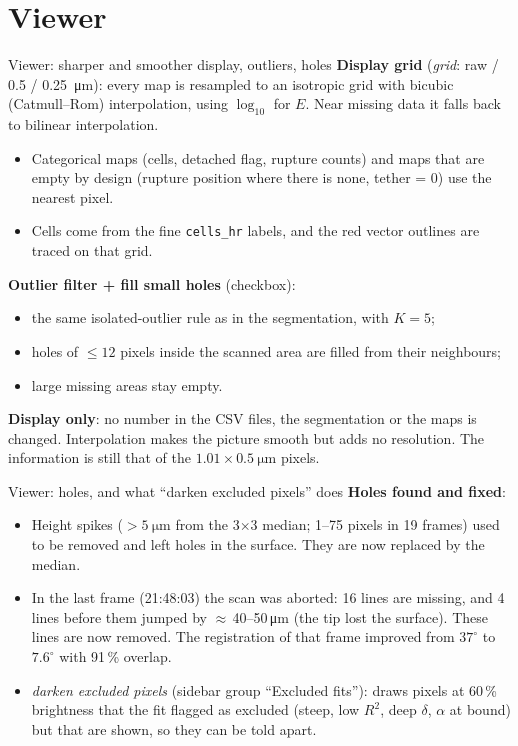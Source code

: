 \documentclass[aspectratio=169,9pt]{beamer}
\begin{document}
\section{Viewer}

\begin{frame}{Viewer: sharper and smoother display, outliers, holes}
\small
\textbf{Display grid} (\emph{grid}: raw / \SI{0.5}{} / \SI{0.25}{\micro\metre}): every map is resampled to an isotropic grid with bicubic (Catmull--Rom) interpolation, using $\log_{10}$ for $E$. Near missing data it falls back to bilinear interpolation.
\begin{itemize}
\item Categorical maps (cells, detached flag, rupture counts) and maps that are empty by design (rupture position where there is none, tether = 0) use the nearest pixel.
\item Cells come from the fine \texttt{cells\_hr} labels, and the red vector outlines are traced on that grid.
\end{itemize}
\textbf{Outlier filter + fill small holes} (checkbox):
\begin{itemize}
\item the same isolated-outlier rule as in the segmentation, with $K=5$;
\item holes of $\le12$ pixels inside the scanned area are filled from their neighbours;
\item large missing areas stay empty.
\end{itemize}
\textbf{Display only}: no number in the CSV files, the segmentation or the maps is changed. Interpolation makes the picture smooth but adds no resolution. The information is still that of the $1.01\times\SI{0.5}{\micro\metre}$ pixels.
\end{frame}

\begin{frame}{Viewer: holes, and what ``darken excluded pixels'' does}
\small
\textbf{Holes found and fixed}:
\begin{itemize}
\item Height spikes ($>\SI{5}{\micro\metre}$ from the 3$\times$3 median; 1--75 pixels in 19 frames) used to be removed and left holes in the surface. They are now replaced by the median.
\item In the last frame (21:48:03) the scan was aborted: 16 lines are missing, and 4 lines before them jumped by $\approx$\,40--50\,\si{\micro\metre} (the tip lost the surface). These lines are now removed. The registration of that frame improved from $37^\circ$ to $7.6^\circ$ with 91\,\% overlap.
\item \emph{darken excluded pixels} (sidebar group ``Excluded fits''): draws pixels at 60\,\% brightness that the fit flagged as excluded (steep, low $R^2$, deep $\delta$, $\alpha$ at bound) but that are shown, so they can be told apart.
\end{itemize}
\end{frame}
\end{document}
